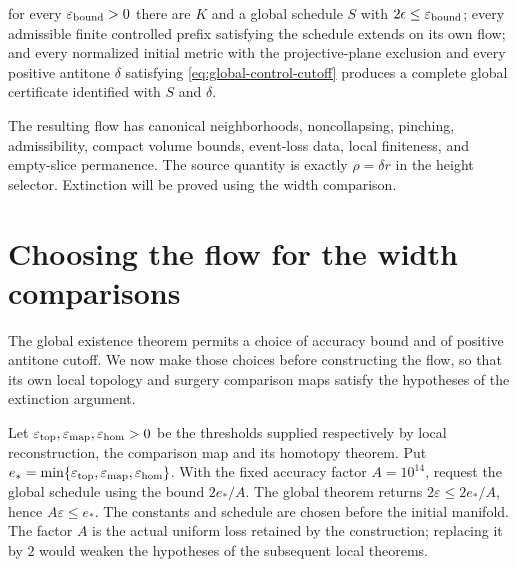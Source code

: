 \begin{theorem}
\label{thm:global-controlled-flow}
for every $\varepsilon_{\rm bound}>0$ there are $K$ and a global schedule
$S$ with $2\epsilon\leq\varepsilon_{\rm bound}$; every admissible
finite controlled prefix satisfying the schedule extends on its own flow;
and every normalized initial metric with the projective-plane exclusion and every
positive antitone $\delta$ satisfying \eqref{eq:global-control-cutoff}
produces a complete global certificate identified with $S$ and $\delta$.
\end{theorem}

The resulting flow has canonical neighborhoods, noncollapsing,
pinching, admissibility, compact volume bounds, event-loss data, local
finiteness, and empty-slice permanence.  The source quantity is exactly
$\rho=\delta r$ in the height selector. Extinction will be proved using
the width comparison.

\section{Choosing the flow for the width comparisons}
\label{sec:global-comparison-calibration}

The global existence theorem permits a choice of accuracy bound and of
positive antitone cutoff.  We now make those choices before constructing
the flow, so that its own local topology and surgery comparison maps
satisfy the hypotheses of the extinction argument.

Let $\varepsilon_{\rm top},\varepsilon_{\rm map},
\varepsilon_{\rm hom}>0$ be the thresholds supplied respectively by
local reconstruction, the comparison map and its homotopy theorem.  Put
$e_* =\min\{\varepsilon_{\rm top},\varepsilon_{\rm map},
\varepsilon_{\rm hom}\}$.  With the fixed accuracy factor
$A=10^{14}$, request the global schedule using the bound $2e_*/A$.
The global theorem returns $2\varepsilon\leq2e_*/A$, hence
$A\varepsilon\leq e_*$.  The constants and schedule are chosen before
the initial manifold.  The factor $A$ is the actual uniform loss retained
by the construction; replacing it by $2$ would weaken the hypotheses of
the subsequent local theorems.

